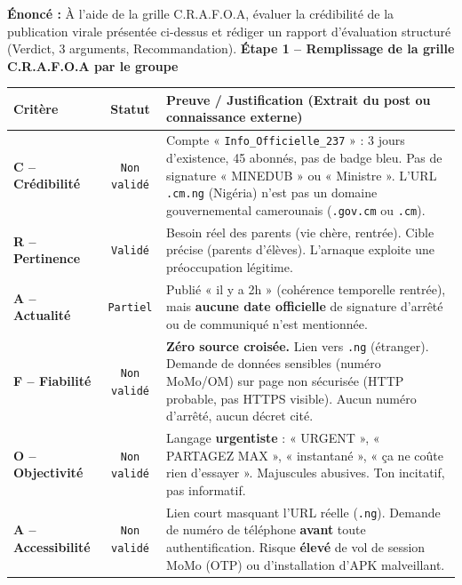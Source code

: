 \documentclass[11pt]{article}
\newcounter{popsec}
\newcounter{popsub}
\newcommand{\courssub}[1]{%
  \stepcounter{popsub}%
  \par\vspace{9pt}\noindent{\popxbold\fontsize{11.5}{13}\selectfont\color{popink}{\color{poporange}\thepopsec.\thepopsub}\hspace{6pt}#1}\par\nopagebreak\vspace{4pt}
}
\begin{document}
\courssub{Démarche et corrigé commenté}
\begin{exoresolu}
\textbf{Énoncé :} À l'aide de la grille C.R.A.F.O.A, évaluer la crédibilité de la publication virale présentée ci-dessus et rédiger un rapport d'évaluation structuré (Verdict, 3 arguments, Recommandation).
\tcblower
\textbf{Étape 1 -- Remplissage de la grille C.R.A.F.O.A par le groupe}

\begin{center}
\begin{tabularx}{\linewidth}{|l|c|X|}\hline
\rowcolor{popblueL}
\textbf{Critère} & \textbf{Statut} & \textbf{Preuve / Justification (Extrait du post ou connaissance externe)} \\\hline
\textbf{C -- Crédibilité} & \cellcolor{poporange!30}\texttt{Non validé} & Compte « \texttt{Info\_Officielle\_237} » : 3 jours d'existence, 45 abonnés, pas de badge bleu. Pas de signature « MINEDUB » ou « Ministre ». L'URL \texttt{.cm.ng} (Nigéria) n'est pas un domaine gouvernemental camerounais (\texttt{.gov.cm} ou \texttt{.cm}). \\\hline
\textbf{R -- Pertinence} & \cellcolor{popgreen!30}\texttt{Validé} & Besoin réel des parents (vie chère, rentrée). Cible précise (parents d'élèves). L'arnaque exploite une préoccupation légitime. \\\hline
\textbf{A -- Actualité} & \cellcolor{poporange!30}\texttt{Partiel} & Publié « il y a 2h » (cohérence temporelle rentrée), mais \textbf{aucune date officielle} de signature d'arrêté ou de communiqué n'est mentionnée. \\\hline
\textbf{F -- Fiabilité} & \cellcolor{poporange!30}\texttt{Non validé} & \textbf{Zéro source croisée.} Lien vers \texttt{.ng} (étranger). Demande de données sensibles (numéro MoMo/OM) sur page non sécurisée (HTTP probable, pas HTTPS visible). Aucun numéro d'arrêté, aucun décret cité. \\\hline
\textbf{O -- Objectivité} & \cellcolor{poporange!30}\texttt{Non validé} & Langage \textbf{urgentiste} : « URGENT », « PARTAGEZ MAX », « instantané », « ça ne coûte rien d'essayer ». Majuscules abusives. Ton incitatif, pas informatif. \\\hline
\textbf{A -- Accessibilité} & \cellcolor{popred!30}\texttt{Non validé} & Lien court masquant l'URL réelle (\texttt{.ng}). Demande de numéro de téléphone \textbf{avant} toute authentification. Risque \textbf{élevé} de vol de session MoMo (OTP) ou d'installation d'APK malveillant. \\\hline
\end{tabularx}
\end{center}


\end{exoresolu}
\end{document}

